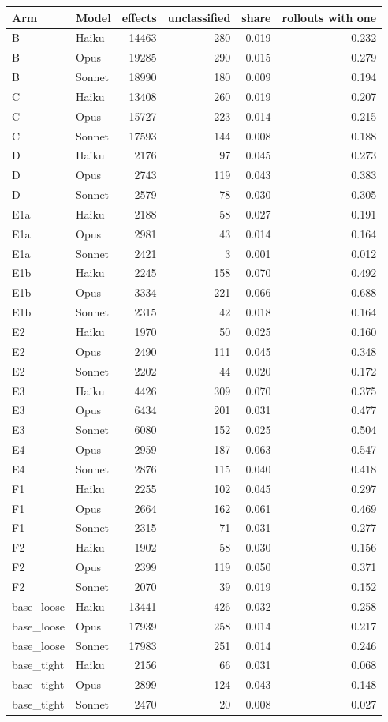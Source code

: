 \begin{tabular}{llrrrr}
\toprule
Arm & Model & effects & unclassified & share & rollouts with one \\
\midrule
B & Haiku & 14463 & 280 & 0.019 & 0.232 \\
B & Opus & 19285 & 290 & 0.015 & 0.279 \\
B & Sonnet & 18990 & 180 & 0.009 & 0.194 \\
C & Haiku & 13408 & 260 & 0.019 & 0.207 \\
C & Opus & 15727 & 223 & 0.014 & 0.215 \\
C & Sonnet & 17593 & 144 & 0.008 & 0.188 \\
D & Haiku & 2176 & 97 & 0.045 & 0.273 \\
D & Opus & 2743 & 119 & 0.043 & 0.383 \\
D & Sonnet & 2579 & 78 & 0.030 & 0.305 \\
E1a & Haiku & 2188 & 58 & 0.027 & 0.191 \\
E1a & Opus & 2981 & 43 & 0.014 & 0.164 \\
E1a & Sonnet & 2421 & 3 & 0.001 & 0.012 \\
E1b & Haiku & 2245 & 158 & 0.070 & 0.492 \\
E1b & Opus & 3334 & 221 & 0.066 & 0.688 \\
E1b & Sonnet & 2315 & 42 & 0.018 & 0.164 \\
E2 & Haiku & 1970 & 50 & 0.025 & 0.160 \\
E2 & Opus & 2490 & 111 & 0.045 & 0.348 \\
E2 & Sonnet & 2202 & 44 & 0.020 & 0.172 \\
E3 & Haiku & 4426 & 309 & 0.070 & 0.375 \\
E3 & Opus & 6434 & 201 & 0.031 & 0.477 \\
E3 & Sonnet & 6080 & 152 & 0.025 & 0.504 \\
E4 & Opus & 2959 & 187 & 0.063 & 0.547 \\
E4 & Sonnet & 2876 & 115 & 0.040 & 0.418 \\
F1 & Haiku & 2255 & 102 & 0.045 & 0.297 \\
F1 & Opus & 2664 & 162 & 0.061 & 0.469 \\
F1 & Sonnet & 2315 & 71 & 0.031 & 0.277 \\
F2 & Haiku & 1902 & 58 & 0.030 & 0.156 \\
F2 & Opus & 2399 & 119 & 0.050 & 0.371 \\
F2 & Sonnet & 2070 & 39 & 0.019 & 0.152 \\
base\_loose & Haiku & 13441 & 426 & 0.032 & 0.258 \\
base\_loose & Opus & 17939 & 258 & 0.014 & 0.217 \\
base\_loose & Sonnet & 17983 & 251 & 0.014 & 0.246 \\
base\_tight & Haiku & 2156 & 66 & 0.031 & 0.068 \\
base\_tight & Opus & 2899 & 124 & 0.043 & 0.148 \\
base\_tight & Sonnet & 2470 & 20 & 0.008 & 0.027 \\
\bottomrule
\end{tabular}
